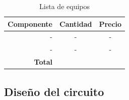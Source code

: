 \begin{table}[H]
\caption{Lista de equipos}
\label{table_2}
\begin{center}
\begin{tabular}{r|cc}
\hline
\textbf{Componente}&\textbf{Cantidad}&\textbf{Precio}\\
 \hline
- &-  &- \\  
-& - &- \\ \hline
 \textbf{Total}& &  \\
 \hline
\end{tabular}
\end{center}
\end{table}

\subsection*{Diseño del circuito}

\newpage